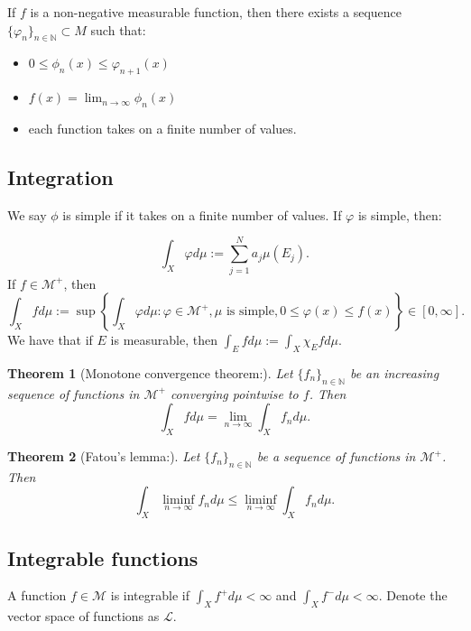 \documentclass{article}
\newtheorem{theorem}{Theorem}
\theoremstyle{definition}
\numberwithin{theorem}{section}
\numberwithin{equation}{section}
\begin{document}
If $f$ is a non-negative measurable function, then there exists a sequence $\lbrace \varphi_n \rbrace_{n \in \mathbb{N}} \subset M$ such that:
\begin{itemize}
	\item $0 \leq \phi_n(x) \leq \varphi_{n+1}(x)$
	\item $f(x) = \lim_{n \rightarrow \infty} \phi_n(x)$
	\item each function takes on a finite number of values. 
\end{itemize}
\subsection{Integration}
We say $\phi$ is simple if it takes on a finite number of values. If $\varphi$ is simple, then:

\begin{equation}
	\int_X \varphi d\mu := \sum_{j = 1}^N a_j \mu(E_j).
\end{equation}
If $f \in \mathcal{M}^+$, then \begin{equation}
	\int_X f d\mu := \sup \left \lbrace \int_X \varphi d\mu: \varphi \in \mathcal{M}^+, \mu \text{ is simple}, 0 \leq \varphi(x) \leq f(x) \right\rbrace \in [0, \infty].
\end{equation}
We have that if $E$ is measurable, then $\int_E f d\mu := \int_X \chi_E f d\mu$. 

\begin{theorem}[Monotone convergence theorem:]
	Let $\lbrace f_n \rbrace_{n \in \mathbb{N}}$ be an increasing sequence of functions in $\mathcal{M}^+$ converging pointwise to $f$. Then \begin{equation}
	\int_X f d\mu = \lim_{n \rightarrow \infty} \int_X f_n d\mu.
\end{equation}
\end{theorem}
\begin{theorem}[Fatou's lemma:]
	Let $\lbrace f_n \rbrace_{n \in \mathbb{N}}$ be a sequence of functions in $\mathcal{M}^+$. Then \begin{equation}
		\int_X \liminf_{n\rightarrow \infty} f_n d\mu \leq \liminf_{n \rightarrow \infty} \int_X f_n d\mu.
	\end{equation}
\end{theorem}

\subsection{Integrable functions}
A function $f \in \mathcal{M}$ is integrable if $\int_X f^+ d \mu < \infty$ and $\int_X f^- d \mu < \infty$. Denote the vector space of functions as $\mathcal{L}$. 
\end{document}
